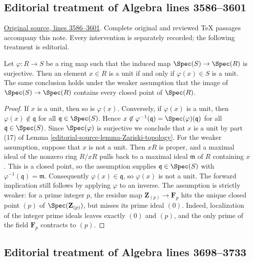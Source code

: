 \subsection{Editorial treatment of Algebra lines 3586--3601}

\hypertarget{algebra-context-017}{}

\noindent\href{https://github.com/stacks/stacks-project/blob/a04446e57ec1fbc252a871afcec7752fb2807b14/algebra.tex\#L3586}{Original source, lines 3586--3601}. Complete original and reviewed TeX passages accompany this note. Every intervention is separately recorded; the following treatment is editorial.


\begin{lemma}
\label{editorial-source-lemma-surjective-on-spec-units}
Let $\varphi : R \to S$ be a ring map such that the induced map
$\Spec(S) \to \Spec(R)$ is surjective. Then an element $x \in R$
is a unit if and only if $\varphi(x) \in S$ is a unit.
The same conclusion holds under the weaker assumption that the image
of $\Spec(S)\to\Spec(R)$ contains every closed point of $\Spec(R)$.
\end{lemma}

\begin{proof}
If $x$ is a unit, then so is $\varphi(x)$. Conversely, if $\varphi(x)$
is a unit, then $\varphi(x) \not \in \mathfrak q$ for all
$\mathfrak q \in \Spec(S)$. Hence
$x \not \in \varphi^{-1}(\mathfrak q) = \Spec(\varphi)(\mathfrak q)$
for all $\mathfrak q \in \Spec(S)$. Since $\Spec(\varphi)$ is surjective
we conclude that $x$ is a unit by
part (17) of Lemma \ref{editorial-source-lemma-Zariski-topology}.
For the weaker assumption, suppose that $x$ is not a unit.
Then $xR$ is proper, and a maximal ideal of the nonzero ring $R/xR$
pulls back to a maximal ideal $\mathfrak m$ of $R$ containing $x$.
This is a closed point, so the assumption supplies
$\mathfrak q\in\Spec(S)$ with
$\varphi^{-1}(\mathfrak q)=\mathfrak m$.
Consequently $\varphi(x)\in\mathfrak q$, so $\varphi(x)$ is not a unit.
The forward implication still follows by applying $\varphi$ to an inverse.
The assumption is strictly weaker: for a prime integer $p$, the residue map
$\mathbf Z_{(p)}\to\mathbf F_p$ hits the unique closed point $(p)$
of $\Spec(\mathbf Z_{(p)})$, but misses its prime ideal $(0)$.
Indeed, localization of the integer prime ideals leaves exactly $(0)$
and $(p)$, and the only prime of the field $\mathbf F_p$ contracts to $(p)$.
\end{proof}


\subsection{Editorial treatment of Algebra lines 3698--3733}


